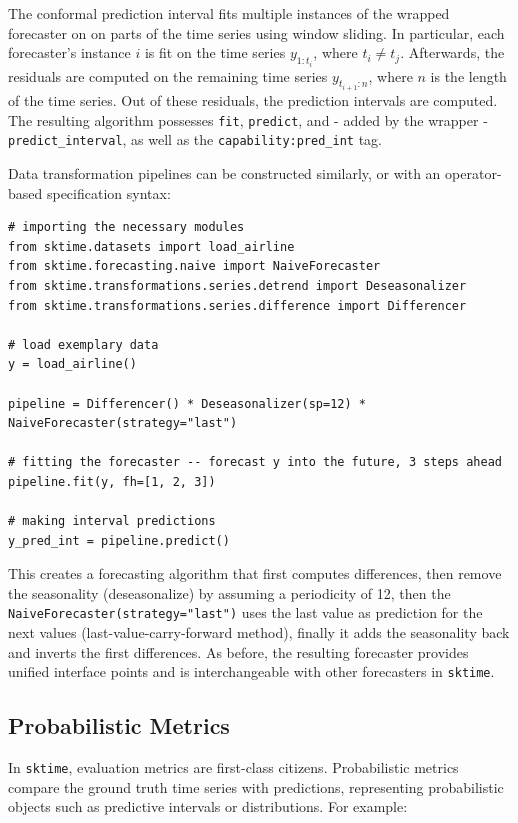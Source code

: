 The conformal prediction interval fits multiple instances of the wrapped forecaster on on parts of the time series using window sliding. In particular, each forecaster's instance $i$
is fit on the time series $y_{1:t_i}$, where $t_i \neq t_j$. Afterwards, the residuals are computed on the remaining time series $y_{t_{i+1}:n}$, where $n$ is the length of the time series.
Out of these residuals, the prediction intervals are computed.
The resulting algorithm possesses \texttt{fit}, \texttt{predict}, and - added by the wrapper - \texttt{predict\_interval}, as well as the \texttt{capability:pred\_int} tag.

Data transformation pipelines can be constructed similarly, or with an operator-based specification syntax:

\begin{verbatim}
# importing the necessary modules
from sktime.datasets import load_airline
from sktime.forecasting.naive import NaiveForecaster
from sktime.transformations.series.detrend import Deseasonalizer
from sktime.transformations.series.difference import Differencer

# load exemplary data
y = load_airline()

pipeline = Differencer() * Deseasonalizer(sp=12) * NaiveForecaster(strategy="last")

# fitting the forecaster -- forecast y into the future, 3 steps ahead
pipeline.fit(y, fh=[1, 2, 3])

# making interval predictions
y_pred_int = pipeline.predict()
\end{verbatim}

This creates a forecasting algorithm that first computes differences, then remove the seasonality (deseasonalize) by assuming a periodicity of 12, 
then the \texttt{NaiveForecaster(strategy="last")} uses the last value as prediction for the next values (last-value-carry-forward method), finally it adds the seasonality back
and inverts the first differences.
As before, the resulting forecaster provides unified interface points and is interchangeable with other forecasters in \texttt{sktime}.

\subsection{Probabilistic Metrics}
In \texttt{sktime}, evaluation metrics are first-class citizens. Probabilistic metrics compare the ground truth time series with predictions, representing probabilistic objects such as predictive intervals or distributions. For example:

